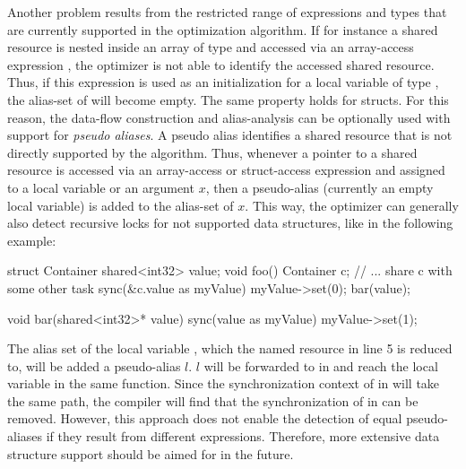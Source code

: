 Another problem results from the restricted range of expressions and types that are currently supported in the optimization algorithm. If for instance a shared resource is nested inside an array  of type  and accessed via an array-access expression , the optimizer is not able to identify the accessed shared resource. Thus, if this expression is used as an initialization for a local variable  of type , the alias-set of  will become empty. The same property holds for structs. For this reason, the data-flow construction and alias-analysis can be optionally used with support for \textit{pseudo aliases}. A pseudo alias identifies a shared resource that is not directly supported by the algorithm. Thus, whenever a pointer to a shared resource is accessed via an array-access or struct-access expression and assigned to a local variable or an argument $x$, then a pseudo-alias (currently an empty local variable) is added to the alias-set of $x$. This way, the optimizer can generally also detect recursive locks for not supported data structures, like in the following example:
\begin{ccode}
struct Container { shared<int32> value; }
void foo() {
  Container c;
  // ... share c with some other task
  sync(&c.value as myValue) {
    myValue->set(0);
    bar(value);
  }
}

void bar(shared<int32>* value) {
  sync(value as myValue) { myValue->set(1); }
}
\end{ccode}
The alias set of the local variable , which the named resource in line 5 is reduced to, will be added a pseudo-alias $l$. $l$ will be forwarded to  in  and reach the local variable  in the same function. Since the synchronization context of  in  will take the same path, the compiler will find that the synchronization of  in  can be removed. However, this approach does not enable the detection of equal pseudo-aliases if they result from different expressions. Therefore, more extensive data structure support should be aimed for in the future.

